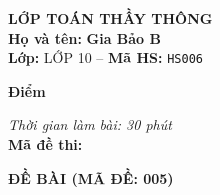 \noindent
\begin{tcolorbox}[colback=white,colframe=black,arc=0mm,boxrule=0.8pt,top=4pt,bottom=4pt,left=6pt,right=6pt]
	\begin{minipage}[c]{0.44\textwidth}
		{\bfseries\large LỚP TOÁN THẦY THÔNG}\\[3pt]
		\textbf{Họ và tên:} \textbf{\large Gia Bảo B}\\[3pt]
		\textbf{Lớp:} LỚP 10 \quad -- \quad \textbf{Mã HS:} \texttt{HS006}
	\end{minipage}
	\hfill
	\begin{minipage}[c]{0.22\textwidth}
		\begin{tcolorbox}[colback=white,colframe=black,arc=0mm,boxrule=0.6pt,height=1.8cm,halign=center,valign=top,top=2pt]
			{\bfseries\normalsize Điểm}
		\end{tcolorbox}
	\end{minipage}
	\hfill
	\begin{minipage}[c]{0.30\textwidth}
		\raggedleft
		\textit{Thời gian làm bài: 30 phút}\\[4pt]
		\textbf{Mã đề thi:} 
	\end{minipage}
\end{tcolorbox}
\vspace{0.25cm}

\noindent\textbf{\large ĐỀ BÀI (MÃ ĐỀ: 005)}
\vspace{0.1cm}

